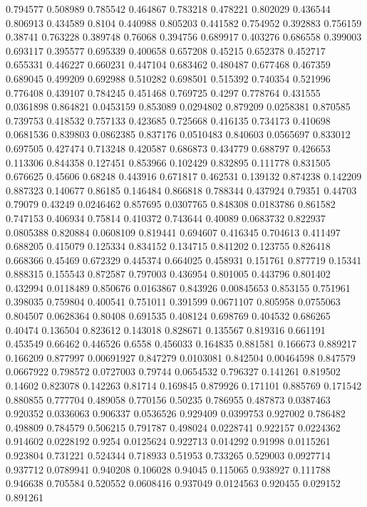 0.794577 0.508989
0.785542 0.464867
0.783218 0.478221
0.802029 0.436544
0.806913 0.434589
0.8104 0.440988
0.805203 0.441582
0.754952 0.392883
0.756159 0.38741
0.763228 0.389748
0.76068 0.394756
0.689917 0.403276
0.686558 0.399003
0.693117 0.395577
0.695339 0.400658
0.657208 0.45215
0.652378 0.452717
0.655331 0.446227
0.660231 0.447104
0.683462 0.480487
0.677468 0.467359
0.689045 0.499209
0.692988 0.510282
0.698501 0.515392
0.740354 0.521996
0.776408 0.439107
0.784245 0.451468
0.769725 0.4297
0.778764 0.431555
0.0361898 0.864821
0.0453159 0.853089
0.0294802 0.879209
0.0258381 0.870585
0.739753 0.418532
0.757133 0.423685
0.725668 0.416135
0.734173 0.410698
0.0681536 0.839803
0.0862385 0.837176
0.0510483 0.840603
0.0565697 0.833012
0.697505 0.427474
0.713248 0.420587
0.686873 0.434779
0.688797 0.426653
0.113306 0.844358
0.127451 0.853966
0.102429 0.832895
0.111778 0.831505
0.676625 0.45606
0.68248 0.443916
0.671817 0.462531
0.139132 0.874238
0.142209 0.887323
0.140677 0.86185
0.146484 0.866818
0.788344 0.437924
0.79351 0.44703
0.79079 0.43249
0.0246462 0.857695
0.0307765 0.848308
0.0183786 0.861582
0.747153 0.406934
0.75814 0.410372
0.743644 0.40089
0.0683732 0.822937
0.0805388 0.820884
0.0608109 0.819441
0.694607 0.416345
0.704613 0.411497
0.688205 0.415079
0.125334 0.834152
0.134715 0.841202
0.123755 0.826418
0.668366 0.45469
0.672329 0.445374
0.664025 0.458931
0.151761 0.877719
0.15341 0.888315
0.155543 0.872587
0.797003 0.436954
0.801005 0.443796
0.801402 0.432994
0.0118489 0.850676
0.0163867 0.843926
0.00845653 0.853155
0.751961 0.398035
0.759804 0.400541
0.751011 0.391599
0.0671107 0.805958
0.0755063 0.804507
0.0628364 0.80408
0.691535 0.408124
0.698769 0.404532
0.686265 0.40474
0.136504 0.823612
0.143018 0.828671
0.135567 0.819316
0.661191 0.453549
0.66462 0.446526
0.6558 0.456033
0.164835 0.881581
0.166673 0.889217
0.166209 0.877997
0.00691927 0.847279
0.0103081 0.842504
0.00464598 0.847579
0.0667922 0.798572
0.0727003 0.79744
0.0654532 0.796327
0.141261 0.819502
0.14602 0.823078
0.142263 0.81714
0.169845 0.879926
0.171101 0.885769
0.171542 0.880855
0.777704 0.489058
0.770156 0.50235
0.786955 0.487873
0.0387463 0.920352
0.0336063 0.906337
0.0536526 0.929409
0.0399753 0.927002
0.786482 0.498809
0.784579 0.506215
0.791787 0.498024
0.0228741 0.922157
0.0224362 0.914602
0.0228192 0.9254
0.0125624 0.922713
0.014292 0.91998
0.0115261 0.923804
0.731221 0.524344
0.718933 0.51953
0.733265 0.529003
0.0927714 0.937712
0.0789941 0.940208
0.106028 0.94045
0.115065 0.938927
0.111788 0.946638
0.705584 0.520552
0.0608416 0.937049
0.0124563 0.920455
0.029152 0.891261
